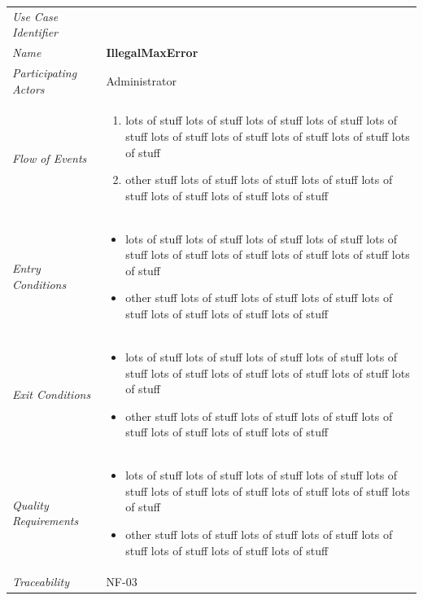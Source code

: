 \documentclass[12pt,letterpaper]{article}
\begin{document}
\begin{center}
	\begin{tabu} to 
		\toprule
		Use Case Identifier & \illegalmaxerror{} \\
		Name & {\bf IllegalMaxError} \\
		Participating Actors & Administrator \\
		Flow of Events & 
	    \begin{enumerate}[topsep=-1em]
		    \item lots of stuff lots of stuff lots of stuff lots of stuff lots of stuff lots of stuff lots of stuff lots of stuff lots of stuff lots of stuff
		    \item other stuff lots of stuff lots of stuff lots of stuff lots of stuff lots of stuff lots of stuff lots of stuff
		\end{enumerate} \\

		Entry Conditions &
		\begin{itemize}[topsep=-1em]
		    \item lots of stuff lots of stuff lots of stuff lots of stuff lots of stuff lots of stuff lots of stuff lots of stuff lots of stuff lots of stuff
		    \item other stuff lots of stuff lots of stuff lots of stuff lots of stuff lots of stuff lots of stuff lots of stuff
        \end{itemize} \\

		Exit Conditions &
		\begin{itemize}[topsep=-1em]
		    \item lots of stuff lots of stuff lots of stuff lots of stuff lots of stuff lots of stuff lots of stuff lots of stuff lots of stuff lots of stuff
		    \item other stuff lots of stuff lots of stuff lots of stuff lots of stuff lots of stuff lots of stuff lots of stuff
        \end{itemize} \\

		Quality Requirements &
		\begin{itemize}[topsep=-1em]
		    \item lots of stuff lots of stuff lots of stuff lots of stuff lots of stuff lots of stuff lots of stuff lots of stuff lots of stuff lots of stuff
		    \item other stuff lots of stuff lots of stuff lots of stuff lots of stuff lots of stuff lots of stuff lots of stuff
        \end{itemize} \\

		Traceability & NF-03 \\
		\toprule
	\end{tabu}
\end{center}
\end{document}
